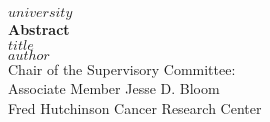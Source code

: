 \thispagestyle{empty}
\vspace*{\fill}
\begin{center}
$university$ \\
\vspace{1cm}
\textbf{Abstract} \\
\vspace{1cm}
\huge{$title$} \\
\vspace{1cm}
\Large{$author$} \\
\vspace{1cm}
Chair of the Supervisory Committee: \\
Associate Member Jesse D. Bloom \\
Fred Hutchinson Cancer Research Center \\
\vspace{1cm}
\end{center}
\vspace*{\fill}
\newpage